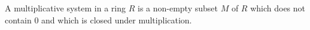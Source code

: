 A multiplicative system in a ring $R$ is a non-empty subset $M$ of $R$ which does not contain $0$ and which is closed under multiplication.
